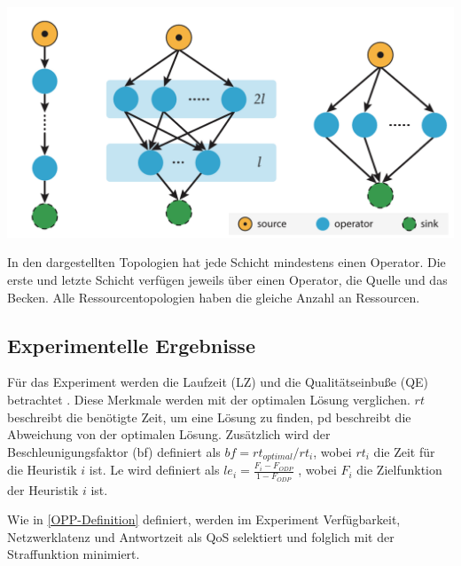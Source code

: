 \documentclass{article}
\begin{document}
\noindent
\begin{minipage}{0.5\textwidth}
    \includegraphics[width=0.9\linewidth]{res/topologies.png}
\label{topologies}
\end{minipage}
\hspace{10pt}
\begin{minipage}{0.45\textwidth}
    In den dargestellten Topologien hat jede Schicht mindestens einen Operator. 
    Die erste und letzte Schicht verfügen jeweils über einen Operator, die Quelle und das Becken. 
    Alle Ressourcentopologien haben die gleiche Anzahl an Ressourcen.
\end{minipage}



\subsection{Experimentelle Ergebnisse}

Für das Experiment werden die Laufzeit (LZ) und die Qualitätseinbuße (QE) betrachtet \cite{efficient-operator-placement}.
Diese Merkmale werden mit der optimalen Lösung verglichen. $rt$ beschreibt die benötigte Zeit, 
um eine Lösung zu finden, pd beschreibt die Abweichung von der optimalen Lösung. 
Zusätzlich wird der Beschleunigungsfaktor (bf) definiert als $bf = rt_{optimal} / rt_i$, wobei $rt_i$ die Zeit für die Heuristik $i$ ist.
Le wird definiert als $le_i = \frac{F_i - F_{ODP}}{1 - F_{ODP}}$ \cite{efficient-operator-placement}, 
wobei $F_i$ die Zielfunktion der Heuristik $i$ ist.

Wie in \ref{OPP-Definition} definiert, werden im Experiment Verfügbarkeit, 
Netzwerklatenz und Antwortzeit als QoS selektiert und folglich mit der Straffunktion minimiert. 


\end{document}
